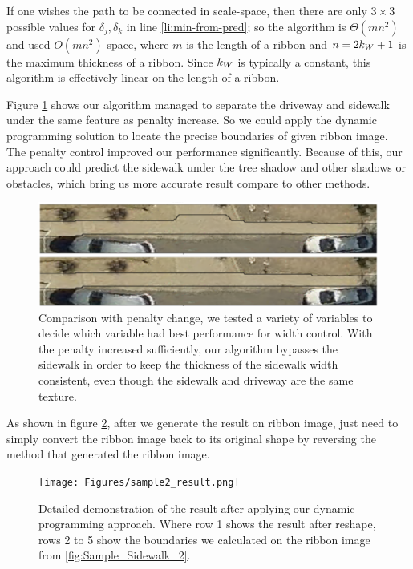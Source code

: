 If one wishes the path to be connected in scale-space, then there are only $3\times3$ possible values for $\delta_j, \delta_k$ in line \ref{li:min-from-pred}; so the algorithm is $\Theta(m n^2)$ and used $O(m n^2)$ space, where $m$ is the length of a ribbon and $n=2k_W+1$ is the maximum thickness of a ribbon. Since $k_W$ is typically a constant, this algorithm is effectively linear on the length of a ribbon.


Figure \ref{fig:penalty} shows our algorithm managed to separate the driveway and sidewalk under the same feature as penalty increase. So we could apply the dynamic programming solution to locate the precise boundaries of given ribbon image. The penalty control improved our performance significantly. Because of this, our approach could predict the sidewalk under the tree shadow and other shadows or obstacles, which bring us more accurate result compare to other methods.
\begin{figure}[H]
    \centering \includegraphics[width=\textwidth]{Figures/penalty.png} \caption[Penalty
    Process]{Comparison with penalty change, we tested a variety of variables to decide which
    variable had best performance for width control. With the penalty increased sufficiently,
     our algorithm bypasses the sidewalk in order to keep the thickness of the
    sidewalk width consistent, even though the sidewalk and driveway are the same texture.} \label{fig:penalty}
\end{figure}

As shown in figure \ref{fig:sample_result2}, after we generate the result on ribbon image, just need
to simply convert the ribbon image back to its original shape by reversing the method that generated
the ribbon image.

\begin{figure}[H]
    \centering
    \texttt{[image: Figures/sample2\_result.png]}
    \caption[Output on a Sample Sidewalk]{
    Detailed demonstration of the result after applying our dynamic programming approach.
     Where row 1 shows the result after reshape, rows 2 to 5 show the boundaries 
     we calculated on the ribbon image from \ref{fig:Sample_Sidewalk_2}.}
    \label{fig:sample_result2}
\end{figure}